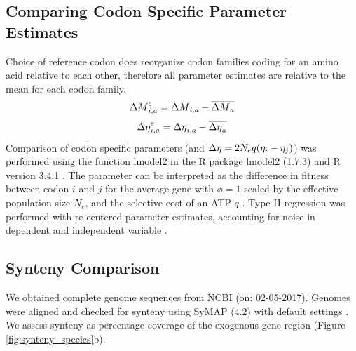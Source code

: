 \documentclass[fleqn,letterpaper]{article}
\begin{document}
\subsection*{Comparing Codon Specific Parameter Estimates}
Choice of reference codon does reorganize codon families coding for an amino acid relative to each other, therefore all parameter estimates are relative to the mean for each codon family.
\begin{equation}
{\Delta M}_{i,a}^c = {\Delta M}_{i,a} - \overline{{\Delta M}_a}
\end{equation}
\begin{equation}
{\Delta \eta}_{i,a}^c = {\Delta \eta}_{i,a} - \overline{{\Delta \eta}_a}
\end{equation}
Comparison of codon specific parameters (\DM and ${\Delta \eta} = 2N_eq(\eta_i-\eta_j)$) was performed using the function lmodel2 in the R package lmodel2 (1.7.3) \citep{lmodel2} and R version 3.4.1 \citep{rcore}.
The parameter \DE can be interpreted as the difference in fitness between codon $i$ and $j$ for the average gene with $\phi = 1$ scaled by the  effective population size $N_e$, and the selective cost of an ATP $q$ \citep{gilchrist2007, gilchrist2015}.
Type II regression was performed with re-centered parameter estimates, accounting for noise in dependent and independent variable \citep{SokalAndRohlf1981}.


\subsection*{Synteny Comparison}
We obtained complete genome sequences from NCBI (on: 02-05-2017).
Genomes were aligned and checked for synteny using SyMAP (4.2) with default settings \citep{soderlund2006, soderlund2011}.
We assess synteny as percentage coverage of the exogenous gene region (Figure \ref{fig:synteny_species}b).
\end{document}
